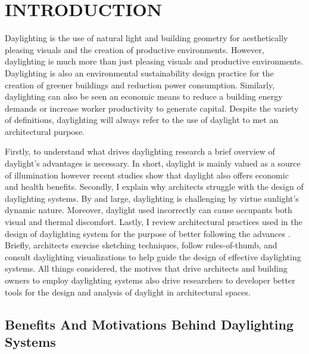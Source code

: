 
\chapter{INTRODUCTION} \label{sec:introduction}

Daylighting is the use of natural light and building geometry for aesthetically pleasing visuals and the creation of productive environments.
However, daylighting is much more than just pleasing visuals and productive environments.
Daylighting is also an environmental sustainability design practice for the creation of greener buildings and reduction power consumption.
Similarly, daylighting can also be seen an  economic means to reduce a building energy demands or increase worker productivity to generate capital.
Despite the variety of definitions, daylighting will always refer to the use of daylight to met an architectural purpose.

Firstly, to understand what drives daylighting research a brief overview of daylight's advantages is necessary.
In short, daylight is mainly valued as a source of illumination however recent studies show that daylight also offers economic and health benefits.
%
Secondly, I explain why architects struggle with the design of daylighting systems.
By and large, daylighting is challenging by virtue sunlight's dynamic nature.
Moreover, daylight used incorrectly can cause occupants both visual and thermal discomfort.
%
Lastly, I review architectural practices used in the design of daylighting system for the purpose of better following the advances .
Briefly, architects exercise sketching techniques, follow rules-of-thumb, and consult daylighting visualizations to help guide the design of effective daylighting systems. 
%
All things considered, the motives that drive architects and building owners to employ daylighting systems also drive researchers to developer better tools for the design and analysis of daylight in architectural spaces.\\

\section{Benefits And Motivations Behind Daylighting Systems}
    
